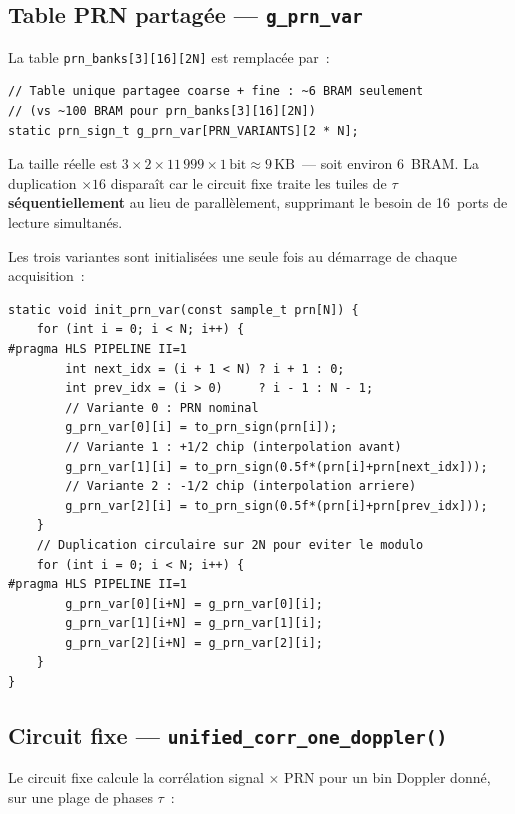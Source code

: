 \documentclass[11pt,a4paper]{article}
\begin{document}
\subsection{Table PRN partagée --- \texttt{g\_prn\_var}}

La table \texttt{prn\_banks[3][16][2N]} est remplacée par~:

\begin{lstlisting}[caption={Table PRN partagée dans acq\_unified.cpp}]
// Table unique partagee coarse + fine : ~6 BRAM seulement
// (vs ~100 BRAM pour prn_banks[3][16][2N])
static prn_sign_t g_prn_var[PRN_VARIANTS][2 * N];
\end{lstlisting}

La taille réelle est $3 \times 2 \times 11\,999 \times 1\,\text{bit} \approx 9\,\text{KB}$~--- soit environ 6~BRAM. La duplication $\times16$ disparaît car le circuit fixe traite les tuiles de $\tau$ \textbf{séquentiellement} au lieu de parallèlement, supprimant le besoin de 16~ports de lecture simultanés.

Les trois variantes sont initialisées une seule fois au démarrage de chaque acquisition~:

\begin{lstlisting}[caption={Initialisation de g\_prn\_var}]
static void init_prn_var(const sample_t prn[N]) {
    for (int i = 0; i < N; i++) {
#pragma HLS PIPELINE II=1
        int next_idx = (i + 1 < N) ? i + 1 : 0;
        int prev_idx = (i > 0)     ? i - 1 : N - 1;
        // Variante 0 : PRN nominal
        g_prn_var[0][i] = to_prn_sign(prn[i]);
        // Variante 1 : +1/2 chip (interpolation avant)
        g_prn_var[1][i] = to_prn_sign(0.5f*(prn[i]+prn[next_idx]));
        // Variante 2 : -1/2 chip (interpolation arriere)
        g_prn_var[2][i] = to_prn_sign(0.5f*(prn[i]+prn[prev_idx]));
    }
    // Duplication circulaire sur 2N pour eviter le modulo
    for (int i = 0; i < N; i++) {
#pragma HLS PIPELINE II=1
        g_prn_var[0][i+N] = g_prn_var[0][i];
        g_prn_var[1][i+N] = g_prn_var[1][i];
        g_prn_var[2][i+N] = g_prn_var[2][i];
    }
}
\end{lstlisting}

\subsection{Circuit fixe --- \texttt{unified\_corr\_one\_doppler()}}

Le circuit fixe calcule la corrélation signal $\times$ PRN pour un bin Doppler donné, sur une plage de phases $\tau$~:
\end{document}
